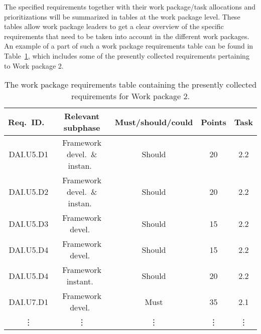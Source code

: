 
The specified requirements
 together
with their work package/task allocations and prioritizations will be summarized in
tables at the work package level. These tables allow work package leaders to get a clear overview of the specific
requirements that need to be taken into account in the different work packages. An example of a part of such a work
package requirements table can be found
in Table~\ref{tab:WP2-requirements}, which includes some of the presently collected requirements pertaining to Work package 2. 


\begin{table}[htbp]
  \centering
  \begin{tabular}{|c|c|c|c|c|}
    \hline
    Req.\ ID.\ & Relevant subphase & Must/should/could & Points & Task \\ \hline\hline
    DAI.U5.D1 & Framework devel.\ \& instan.\ & Should & 20 & 2.2  \\
    DAI.U5.D2 & Framework devel.\ \& instan.\ & Should & 20 & 2.2  \\
    DAI.U5.D3 & Framework devel.\ & Should & 15 & 2.2  \\
    DAI.U5.D4 & Framework devel.\ & Should & 15 & 2.2  \\
    DAI.U5.D4 & Framework instant.\ & Should & 20 & 2.2  \\
    DAI.U7.D1 & Framework devel.\ & Must & 35 & 2.1 \\
   \vdots & \vdots  & \vdots & \vdots & \vdots \\ \hline\hline
  \end{tabular}
  
  \caption{The work package requirements table containing the presently collected requirements for Work package 2.}
  \label{tab:WP2-requirements}
\end{table}



